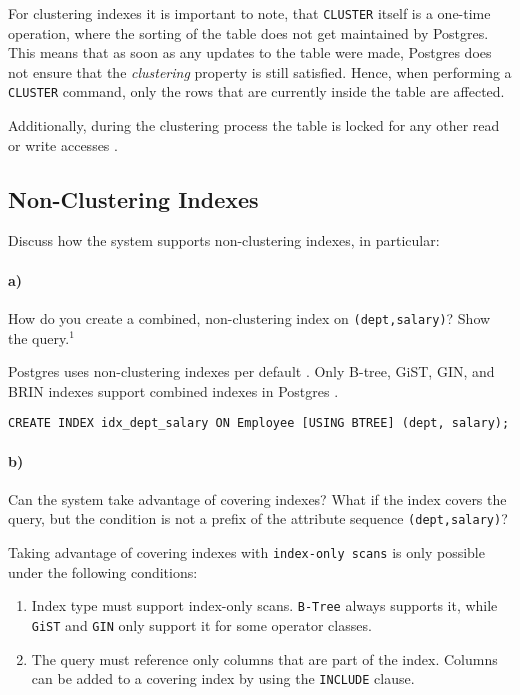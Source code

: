 \documentclass[11pt]{scrartcl}
\begin{document}
For clustering indexes it is important to note, that \texttt{CLUSTER} itself is a one-time operation, where the
sorting of the table does not get maintained by Postgres.
This means that as soon as any updates to the table were made, Postgres does not ensure that the \textit{clustering}
property is still satisfied.
Hence, when performing a \texttt{CLUSTER} command, only the rows that are currently inside the table are affected.

Additionally, during the clustering process the table is locked for any other read or write accesses \cite{PostgreSQL2024Cluster}.

\subsection{Non-Clustering Indexes}

Discuss how the system supports non-clustering indexes, in particular:

\paragraph{a)}

How do you create a combined, non-clustering index on \texttt{(dept,salary)}? Show the query.$^1$

Postgres uses non-clustering indexes per default \cite{SO_PostgresClusterVsNonCluster}.
Only B-tree, GiST, GIN, and BRIN indexes support combined indexes in Postgres \cite{PostgreSQL2024MultiColumnIndex}.

\begin{lstlisting}[style=dbtsql]
CREATE INDEX idx_dept_salary ON Employee [USING BTREE] (dept, salary);
\end{lstlisting}

\paragraph{b)}

Can the system take advantage of covering indexes? What if the index covers the query, but the condition is not a prefix of the attribute sequence \texttt{(dept,salary)}?

Taking advantage of covering indexes with \texttt{index-only scans} is only possible under the following conditions:

\begin{enumerate}
    \item Index type must support index-only scans. \texttt{B-Tree} always supports it, while \texttt{GiST} and
    \texttt{GIN} only support it for some operator classes.
    \item The query must reference only columns that are part of the index.
    Columns can be added to a covering index by using the \texttt{INCLUDE} clause.
\end{enumerate}
\end{document}

